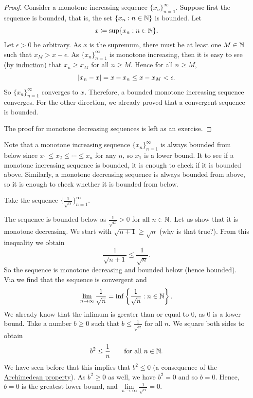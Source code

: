 \begin{proof}
Consider a monotone increasing sequence $\{ x_n \}_{n=1}^\infty$.  Suppose 
first the sequence is bounded,
that is,
the set $\{ x_n : n \in  {\mathbb{N}} \}$ is bounded.  Let
\begin{equation*}
x \coloneqq \sup \{ x_n : n \in {\mathbb{N}} \} .
\end{equation*}
Let $\epsilon > 0$ be arbitrary.  As $x$ is the supremum,
there must be at least one $M \in {\mathbb{N}}$ such that $x_{M} > x-\epsilon$.
As $\{ x_n \}_{n=1}^\infty$ is monotone increasing,
then it is easy to see (by \hyperref[induction:thm]{induction}) that
$x_n \geq x_{M}$ for all $n \geq M$.  Hence for all $n \geq M$,
\begin{equation*}
\left\lvert {x_n-x} \right\rvert = x-x_n \leq x-x_{M} < \epsilon  .
\end{equation*}
So $\{ x_n \}_{n=1}^\infty$ converges to $x$.
Therefore, a bounded monotone increasing sequence converges.
For the other direction, we already proved that a convergent sequence
is bounded.

The proof for monotone decreasing sequences is left as an exercise.
\end{proof}

Note that a monotone increasing sequence $\{ x_n \}_{n=1}^\infty$
is always bounded from below since $x_1 \leq x_2 \leq \cdots \leq x_n$
for any $n$, so $x_1$ is a lower bound.  It to see if a 
monotone increasing sequence is bounded, it is enough to check if
it is bounded above.  Similarly, a monotone decreasing sequence
is always bounded from above, so it is enough to check whether it
is bounded from below.

\begin{example}
Take the sequence $\bigl\{ \frac{1}{\sqrt{n}} \bigr\}_{n=1}^\infty$.

The sequence is
bounded below as
$\frac{1}{\sqrt{n}} > 0$ for all $n \in {\mathbb{N}}$.
Let us show that it is monotone decreasing.  We start with
$\sqrt{n+1} \geq \sqrt{n}$ (why is that true?).  From this inequality
we obtain
\begin{equation*}
\frac{1}{\sqrt{n+1}} \leq \frac{1}{\sqrt{n}} .
\end{equation*}
So the sequence is monotone decreasing and bounded below (hence
bounded).  Via  we find that the sequence is
convergent and
\begin{equation*}
\lim_{n\to \infty} \frac{1}{\sqrt{n}}
=
\inf \left\{ \frac{1}{\sqrt{n}} : n \in {\mathbb{N}} \right\} .
\end{equation*}
We already know that the infimum is greater than or equal to 0, as
0 is a lower bound.  Take a number $b \geq 0$ such
that $b \leq \frac{1}{\sqrt{n}}$ for all $n$.  We square both sides to
obtain
\begin{equation*}
b^2 \leq \frac{1}{n} \qquad \text{for all } n \in {\mathbb{N}}.
\end{equation*}
We have seen before that this implies that $b^2 \leq 0$ (a consequence
of the \hyperref[thm:arch:i]{Archimedean property}).  As $b^2 \geq 0$ as
well, we have $b^2 = 0$
and so $b = 0$.
Hence, $b=0$ is the greatest lower bound, and $\lim\limits_{n\to\infty} \frac{1}{\sqrt{n}} = 0$.
\end{example}


